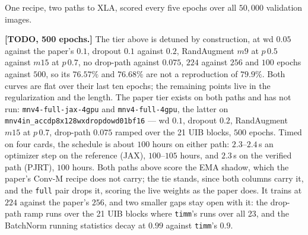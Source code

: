 \begin{center}
\end{center}

\noindent One recipe, two paths to XLA, scored every five epochs over
all $50{,}000$ validation images.

\medskip\noindent\textbf{[TODO, 500 epochs.]} The tier above is detuned by
construction, at wd $0.05$ against the paper's $0.1$, dropout $0.1$ against
$0.2$, RandAugment $m9$ at $p\,0.5$ against $m15$ at $p\,0.7$, no
drop-path against $0.075$, $224$
against $256$ and $100$ epochs against $500$, so its $76.57\%$ and
$76.68\%$ are not a reproduction of $79.9\%$. Both curves are flat over
their last ten epochs; the remaining points live in the regularization and
the length. The paper tier exists on both paths and has not run:
\texttt{mnv4-full-jax-4gpu} and \texttt{mnv4-full-4gpu}, the latter on
\texttt{mnv4in\_accdp8x128wxdropdowd01bf16} --- wd $0.1$, dropout $0.2$,
RandAugment $m15$ at $p\,0.7$, drop-path $0.075$ ramped over the 21 UIB
blocks, $500$ epochs. Timed on four cards, the schedule is about $100$
hours on either path: $2.3$--$2.4$\,s an optimizer step on the reference
(JAX), $100$--$105$ hours, and $2.3$\,s on the verified path (PJRT), $100$
hours. Both paths above score the EMA shadow, which the paper's Conv-M
recipe does not carry; the tie stands, since both columns carry it, and the
\texttt{full} pair drops it, scoring the live weights as the paper does. It
trains at $224$ against the paper's $256$, and two smaller gaps stay open
with it: the drop-path ramp runs over the 21 UIB blocks where
\texttt{timm}'s runs over all 23, and the BatchNorm running statistics
decay at $0.99$ against \texttt{timm}'s $0.9$.

